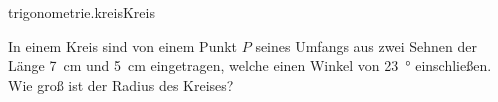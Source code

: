 \begin{exercise}{trigonometrie.kreis}{Kreis}
  \ifproblem\problem\par
    In einem Kreis sind von einem Punkt $P$ seines Umfangs aus
    zwei Sehnen der Länge \SI{7}{\centi\metre} und
    \SI{5}{\centi\metre} eingetragen, welche einen Winkel von
    \SI{23}{\degree} einschließen. Wie groß ist der Radius
    des Kreises?
  \fi
\end{exercise}

